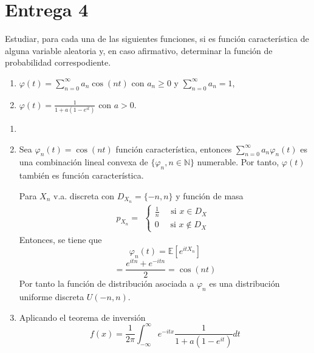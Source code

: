\section{Entrega 4}

\begin{ejr}
  Estudiar, para cada una de las siguientes funciones, si es función característica de alguna variable aleatoria y, en caso afirmativo, determinar la función de probabilidad correspodiente.
  \begin{enumerate}[label=(\roman*)]
    \item $\varphi(t) = \sum_{n = 0}^{\infty} a_{n} \cos(n t)$ con $a_{n} \geq 0$ y $\sum_{n = 0}^{\infty} a_{n} = 1$,
    \item $\varphi(t) = \frac{1}{1 + a(1 - e^{it})}$ con $a > 0$.
  \end{enumerate}
\end{ejr}

\begin{sol}
  \begin{enumerate}[label=(\roman*)]
    \item []
    \item Sea $\varphi_{n}(t) = \cos(n t)$ función característica, entonces $\sum_{n = 0}^{\infty} a_{n} \varphi_{n}(t)$ es una combinación lineal convexa de $\{ \varphi_{n}, n \in \mathbb{N} \}$ numerable. Por tanto, $\varphi(t)$ también es función característica. 

      Para $X_{n}$ v.a. discreta con $D_{X_{n}} = \{ -n, n \}$ y función de masa
      \[ 
        p_{X_{n}} =
        \begin{aligned}
          \begin{cases}
            \frac{1}{n} \quad \text{ si } x \in D_{X} \\
            0 \quad \text{ si } x \not \in D_{X}
          \end{cases}
        \end{aligned}
      \] 
      Entonces, se tiene que
      \[
        \varphi_{n}(t) = \mathbb{E} [ e^{itX_{n}} ] 
      \]
      \[ 
        = \frac{e^{itn} + e^{-itn}}{2} = \cos(nt) 
      \] 
      Por tanto la función de distribución asociada a $\varphi_{n}$ es una distribución uniforme discreta $U(-n,n)$. 
    \item Aplicando el teorema de inversión 
      \[ 
        f(x) = \frac{1}{2 \pi} \int_{-\infty}^{\infty} e^{-itx} \frac{1}{1 + a(1 - e^{it})} dt
      \] 
  \end{enumerate}
\end{sol}
